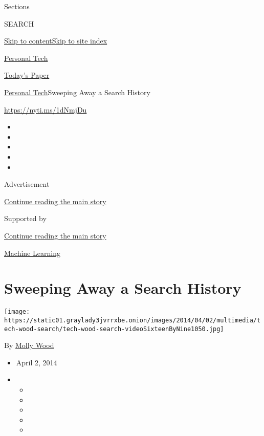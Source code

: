 Sections

SEARCH

\protect\hyperlink{site-content}{Skip to
content}\protect\hyperlink{site-index}{Skip to site index}

\href{https://www.nytimes3xbfgragh.onion/section/technology/personaltech}{Personal
Tech}

\href{https://myaccount.nytimes3xbfgragh.onion/auth/login?response_type=cookie\&client_id=vi}{}

\href{https://www.nytimes3xbfgragh.onion/section/todayspaper}{Today's
Paper}

\href{/section/technology/personaltech}{Personal Tech}\textbar{}Sweeping
Away a Search History

\href{https://nyti.ms/1dNmjDu}{https://nyti.ms/1dNmjDu}

\begin{itemize}
\item
\item
\item
\item
\item
\end{itemize}

Advertisement

\protect\hyperlink{after-top}{Continue reading the main story}

Supported by

\protect\hyperlink{after-sponsor}{Continue reading the main story}

\href{/column/machine-learning}{Machine Learning}

\hypertarget{sweeping-away-a-search-history}{%
\section{Sweeping Away a Search
History}\label{sweeping-away-a-search-history}}

\texttt{[image: https://static01.graylady3jvrrxbe.onion/images/2014/04/02/multimedia/tech-wood-search/tech-wood-search-videoSixteenByNine1050.jpg]}

By \href{http://www.nytimes3xbfgragh.onion/by/molly-wood}{Molly Wood}

\begin{itemize}
\item
  April 2, 2014
\item
  \begin{itemize}
  \item
  \item
  \item
  \item
  \item
  \end{itemize}
\end{itemize}

